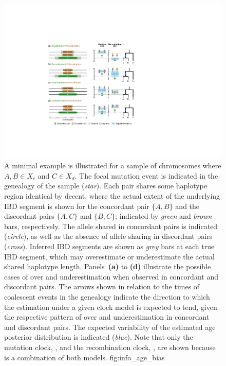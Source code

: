 

\begin{figure}[p]
\centering
\includegraphics[width=\textwidth]{./img/ch5/info_age_bias}
%
{A minimal example is illustrated for a sample of  chromosomes where ${A,B \in X_c}$ and ${C \in X_d}$.
The focal mutation event is indicated in the genealogy of the sample (\emph{star}).
Each pair shares some haplotype region identical by decent, where the actual extent of the underlying IBD segment is shown for the concordant pair ${\{A,B\}}$ and the discordant pairs ${\{A,C\}}$ and ${\{B,C\}}$; indicated by \emph{green} and \emph{brown} bars, respectively.
The allele shared in concordant pairs is indicated (\emph{circle}), as well as the absence of allele sharing in discordant pairs (\emph{cross}).
Inferred IBD segments are shown as \emph{grey} bars at each true IBD segment, which may overestimate or underestimate the actual shared haplotype length.
Panels~\textbf{(a)} to \textbf{(d)} illustrate the possible cases of over and underestimation when observed in concordant and discordant pairs.
The arrows shown in relation to the times of coalescent events in the genealogy indicate the  direction to which the estimation under a given clock model is expected to tend, given the respective pattern of over and underestimation in concordant and discordant pairs.
The expected variability of the estimated age posterior distribution is indicated (\emph{blue}).
Note that only the mutation clock, \ClockM, and the recombination clock, \ClockR, are shown because \ClockC is a combination of both models.}%
{fig:info_age_bias}
\end{figure}
